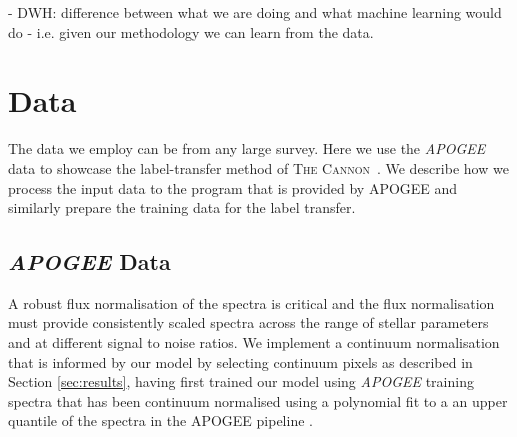 \documentclass[12pt, preprint]{aastex}
\newcommand{\tc}{\textsc{The Cannon}}
\begin{document}

- DWH: difference between what we are doing and what machine learning would do - i.e. given our methodology we can learn from the data. 



\section{Data}

The data we employ can be from any large survey. Here we use the \textit{APOGEE} data to showcase the label-transfer method of \tc\ . We describe how we process the input data to the program that is provided by APOGEE and similarly prepare the training data for the label transfer. 

\subsection{\textit{APOGEE} Data}

A robust flux normalisation of the spectra is critical and the flux normalisation must provide consistently scaled spectra across the range of stellar parameters and at different signal to noise ratios. We implement a continuum normalisation that is informed by our model by selecting continuum pixels as described in Section \ref{sec:results}, having first trained our model using \textit{APOGEE} training spectra that has been continuum normalised using a polynomial fit to a an upper quantile of the spectra in the APOGEE pipeline \citep{Meszaros2013}. 
\end{document}
